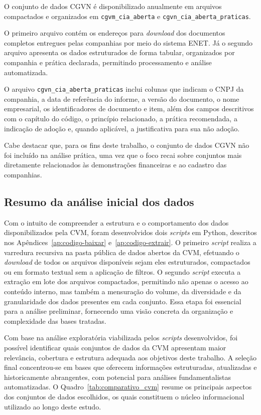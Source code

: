 O conjunto de dados CGVN é disponibilizado anualmente em arquivos compactados e organizados em \texttt{cgvm\_cia\_aberta} e \texttt{cgvn\_cia\_aberta\_praticas}.

O primeiro arquivo contém os endereços para \textit{download} dos documentos completos entregues pelas companhias por meio do sistema ENET. Já o segundo arquivo apresenta os dados estruturados de forma tabular, organizados por companhia e prática declarada, permitindo processamento e análise automatizada.

O arquivo \texttt{cgvn\_cia\_aberta\_praticas} inclui colunas que indicam o CNPJ da companhia, a data de referência do informe, a versão do documento, o nome empresarial, os identificadores de documento e item, além dos campos descritivos com o capítulo do código, o princípio relacionado, a prática recomendada, a indicação de adoção e, quando aplicável, a justificativa para sua não adoção.

Cabe destacar que, para os fins deste trabalho, o conjunto de dados CGVN não foi incluído na análise prática, uma vez que o foco recai sobre conjuntos mais diretamente relacionados às demonstrações financeiras e ao cadastro das companhias.


\subsection{Resumo da análise inicial dos dados}

Com o intuito de compreender a estrutura e o comportamento dos dados disponibilizados pela CVM, foram desenvolvidos dois \textit{scripts} em Python, descritos nos Apêndices~\ref{ap:codigo-baixar} e~\ref{ap:codigo-extrair}. O primeiro \textit{script} realiza a varredura recursiva na pasta pública de dados abertos da CVM, efetuando o \textit{download} de todos os arquivos disponíveis sejam eles estruturados, compactados ou em formato textual sem a aplicação de filtros. O segundo \textit{script} executa a extração em lote dos arquivos compactados, permitindo não apenas o acesso ao conteúdo interno, mas também a mensuração do volume, da diversidade e da granularidade dos dados presentes em cada conjunto. Essa etapa foi essencial para a análise preliminar, fornecendo uma visão concreta da organização e complexidade das bases tratadas.

Com base na análise exploratória viabilizada pelos \textit{scripts} desenvolvidos, foi possível identificar quais conjuntos de dados da CVM apresentam maior relevância, cobertura e estrutura adequada aos objetivos deste trabalho. A seleção final concentrou-se em bases que oferecem informações estruturadas, atualizadas e historicamente abrangentes, com potencial para análises fundamentalistas automatizadas. O Quadro~\ref{tab:comparativo_cvm} resume os principais aspectos dos conjuntos de dados escolhidos, os quais constituem o núcleo informacional utilizado ao longo deste estudo.


